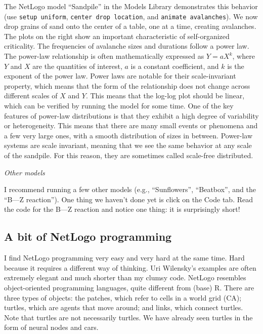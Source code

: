 \documentclass[
  a4paper,
  DIV=11,
  numbers=noendperiod,
  oneside]{scrreprt}
\begin{document}
The NetLogo model ``Sandpile'' in the Models Library demonstrates this
behavior (use \texttt{setup\ uniform}, \texttt{center\ drop\ location},
and \texttt{animate\ avalanches}). We now drop grains of sand onto the
center of a table, one at a time, creating avalanches. The plots on the
right show an important characteristic of self-organized criticality.
The frequencies of avalanche sizes and durations follow a power law. The
power-law relationship is often mathematically expressed as \(Y=aX^k\),
where \(Y\) and \(X\) are the quantities of interest, \(a\) is a
constant coefficient, and \(k\) is the exponent of the power law. Power
laws are notable for their scale-invariant property, which means that
the form of the relationship does not change across different scales of
\(X\) and \(Y\). This means that the log-log plot should be linear,
which can be verified by running the model for some time. One of the key
features of power-law distributions is that they exhibit a high degree
of variability or heterogeneity. This means that there are many small
events or phenomena and a few very large ones, with a smooth
distribution of sizes in between. Power-law systems are scale invariant,
meaning that we see the same behavior at any scale of the sandpile. For
this reason, they are sometimes called scale-free distributed.

\emph{Other models}

I recommend running a few other models (e.g., ``Sunflowers'',
``Beatbox'', and the ``B---Z reaction''). One thing we haven't done yet
is click on the Code tab. Read the code for the B---Z reaction and
notice one thing: it is surprisingly short!

\subsection{A bit of NetLogo
programming}\label{sec-A-bit-of-NetLogo-programming}

I find NetLogo programming very easy and very hard at the same time.
Hard because it requires a different way of thinking. Uri Wilensky's
examples are often extremely elegant and much shorter than my clumsy
code. NetLogo resembles object-oriented programming languages, quite
different from (base) R. There are three types of objects: the patches,
which refer to cells in a world grid (CA); turtles, which are agents
that move around; and links, which connect turtles. Note that turtles
are not necessarily turtles. We have already seen turtles in the form of
neural nodes and cars.
\end{document}
